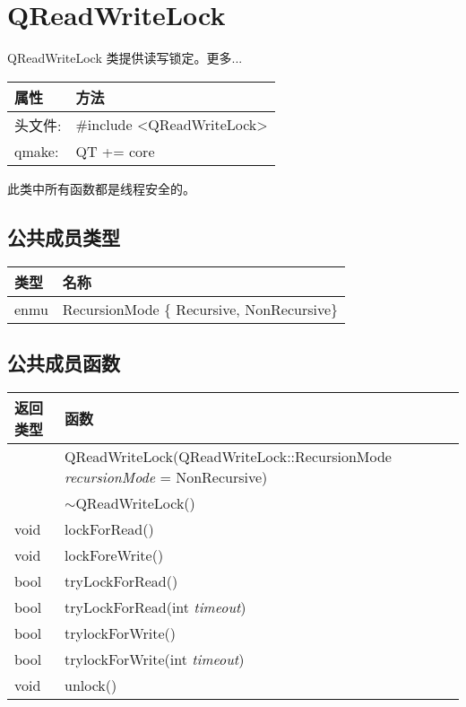 \chapter{QReadWriteLock}

QReadWriteLock 类提供读写锁定。更多...

\begin{tabular}{|l|l|}
\hline
属性 &	方法\\
\hline
头文件:& 	\#include <QReadWriteLock>\\
\hline
qmake:& 	QT += core\\
\hline
\end{tabular}

\begin{notice}
此类中所有函数都是线程安全的。
\end{notice}

\section{公共成员类型}

\begin{tabular}{|l|l|}
\hline
类型 &	名称\\
\hline
enmu 	& RecursionMode \{ Recursive, NonRecursive\}\\
\hline
\end{tabular}


\section{公共成员函数}

\begin{tabular}{|l|l|}
\hline
返回类型 &	函数 \\ 
\hline
& QReadWriteLock(QReadWriteLock::RecursionMode \emph{recursionMode} = NonRecursive) \\
\hline
& $\sim$QReadWriteLock() \\ 
void &	lockForRead() \\ 
\hline
void &	lockForeWrite() \\ 
\hline
bool &	tryLockForRead()\\ 
\hline
bool &	tryLockForRead(int \emph{timeout}) \\ 
\hline
bool &	trylockForWrite() \\ 
\hline
bool &	trylockForWrite(int \emph{timeout}) \\ 
\hline
void &	unlock() \\ 
\hline
\end{tabular}

